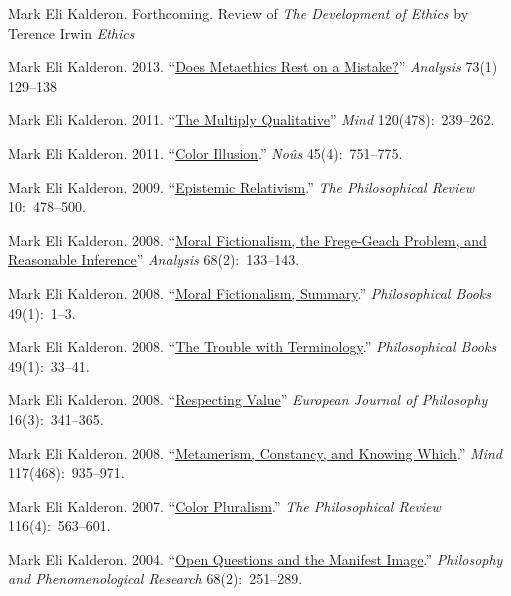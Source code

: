 \documentclass[11pt]{article}
\begin{document}
\ind Mark Eli Kalderon. Forthcoming. Review of \emph{The Development of Ethics} by Terence Irwin \emph{Ethics}

\ind Mark Eli Kalderon. 2013. ``\href{http://dx.doi.org/10.1093/analys/ans147}{Does Metaethics Rest on a Mistake?}'' \emph{Analysis} 73(1) 129--138

\ind Mark Eli Kalderon. 2011. ``\href{http://mind.oxfordjournals.org/content/120/478/239.full.pdf+html}{The Multiply Qualitative}'' \emph{Mind} 120(478):~239--262. 

\ind Mark Eli Kalderon. 2011. ``\href{http://onlinelibrary.wiley.com/doi/10.1111/j.1468-0068.2010.00781.x/pdf}{Color Illusion}.''
 \emph{No{\^u}s} 45(4):~751--775.

\ind Mark Eli Kalderon. 2009. ``\href{http://philreview.dukejournals.org/content/118/2/225.full.pdf+html}{Epistemic Relativism}.'' \emph{The Philosophical Review} 10:~478--500. 

\ind Mark Eli Kalderon. 2008. ``\href{http://onlinelibrary.wiley.com/doi/10.1111/j.1467-8284.2007.00728.x/full}{Moral Fictionalism, the Frege-Geach Problem, and Reasonable Inference}'' \emph{Analysis} 68(2):~133--143. 


\ind Mark Eli Kalderon. 2008. ``\href{http://onlinelibrary.wiley.com/doi/10.1111/j.1468-0149.2008.454_1.x/pdf}{Moral Fictionalism, Summary}.'' \emph{Philosophical Books} 49(1):~1--3.


\ind Mark Eli Kalderon. 2008.  ``\href{http://onlinelibrary.wiley.com/doi/10.1111/j.1468-0149.2008.454_5.x/abstract}{The Trouble with Terminology}.'' \emph{Philosophical Books} 49(1):~33--41.


\ind Mark Eli Kalderon. 2008. ``\href{http://onlinelibrary.wiley.com/doi/10.1111/j.1468-0378.2008.00324.x/pdf}{Respecting Value}''  \emph{European Journal of Philosophy}
16(3):~341--365.


\ind  Mark Eli Kalderon. 2008.  ``\href{http://mind.oxfordjournals.org/content/117/468/935.full.pdf+html}{Metamerism, Constancy, and Knowing Which}.'' \emph{Mind} 117(468):~935--971. 

\ind  Mark Eli Kalderon. 2007.  ``\href{http://philreview.dukejournals.org/content/116/4/563.full.pdf+html}{Color Pluralism}.'' \emph{The Philosophical Review} 116(4):~563--601.

\ind  Mark Eli Kalderon. 2004.  ``\href{http://onlinelibrary.wiley.com/doi/10.1111/j.1933-1592.2004.tb00341.x/pdf}{Open Questions and the Manifest Image}.'' \emph{Philosophy and Phenomenological Research} 68(2):~251--289.
\end{document}
